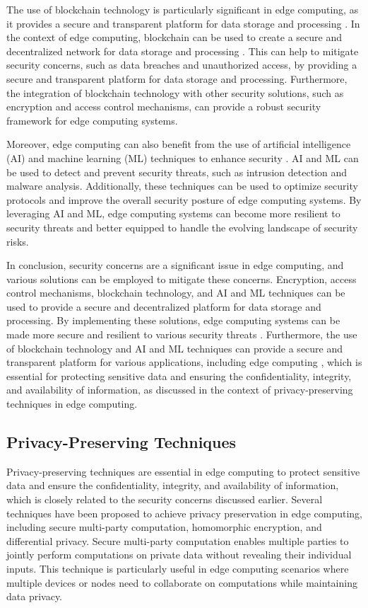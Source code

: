 \documentclass[11pt]{article}
\begin{document}
The use of blockchain technology is particularly significant in edge computing, as it provides a secure and transparent platform for data storage and processing \cite{ref111}. In the context of edge computing, blockchain can be used to create a secure and decentralized network for data storage and processing \cite{ref112}. This can help to mitigate security concerns, such as data breaches and unauthorized access, by providing a secure and transparent platform for data storage and processing. Furthermore, the integration of blockchain technology with other security solutions, such as encryption and access control mechanisms, can provide a robust security framework for edge computing systems.

Moreover, edge computing can also benefit from the use of artificial intelligence (AI) and machine learning (ML) techniques to enhance security \cite{ref113}. AI and ML can be used to detect and prevent security threats, such as intrusion detection and malware analysis. Additionally, these techniques can be used to optimize security protocols and improve the overall security posture of edge computing systems. By leveraging AI and ML, edge computing systems can become more resilient to security threats and better equipped to handle the evolving landscape of security risks.

In conclusion, security concerns are a significant issue in edge computing, and various solutions can be employed to mitigate these concerns. Encryption, access control mechanisms, blockchain technology, and AI and ML techniques can be used to provide a secure and decentralized platform for data storage and processing. By implementing these solutions, edge computing systems can be made more secure and resilient to various security threats \cite{ref68}. Furthermore, the use of blockchain technology and AI and ML techniques can provide a secure and transparent platform for various applications, including edge computing \cite{ref114}, which is essential for protecting sensitive data and ensuring the confidentiality, integrity, and availability of information, as discussed in the context of privacy-preserving techniques in edge computing.

\subsection{Privacy-Preserving Techniques}

Privacy-preserving techniques are essential in edge computing to protect sensitive data and ensure the confidentiality, integrity, and availability of information, which is closely related to the security concerns discussed earlier. Several techniques have been proposed to achieve privacy preservation in edge computing, including secure multi-party computation, homomorphic encryption, and differential privacy. Secure multi-party computation \cite{ref115} enables multiple parties to jointly perform computations on private data without revealing their individual inputs. This technique is particularly useful in edge computing scenarios where multiple devices or nodes need to collaborate on computations while maintaining data privacy.
\end{document}
